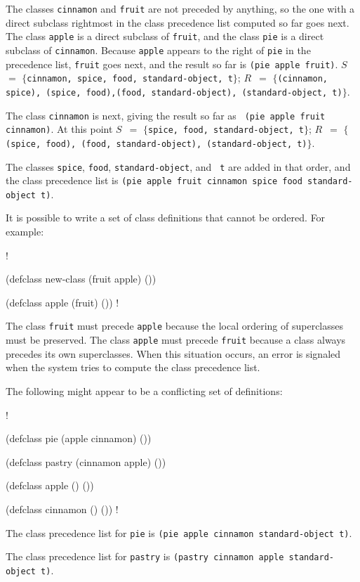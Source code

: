 The classes {\tt cinnamon} and {\tt fruit} are not preceded by
anything, so the one with a direct subclass rightmost in the class
precedence list computed so far goes next.  The class {\tt apple} is a
direct subclass of {\tt fruit}, and the class {\tt pie} is a direct
subclass of {\tt cinnamon}.  Because {\tt apple} appears to the right
of {\tt pie} in the precedence list, {\tt fruit} goes next, and the
result so far is {\tt (pie apple fruit)}.  $S$~$=$ $\{${\tt cinnamon,
spice, food, standard-object, t}$\}$; $R$~$=$ $\{${\tt (cinnamon,
spice), (spice, food),\hfil\break (food, standard-object),
(standard-object, t)}$\}$.

The class {\tt cinnamon} is next, giving the result so far as {\tt
(pie apple fruit cinnamon)}.  At this point $S$~$=$ $\{${\tt spice,
food, standard-object, t}$\}$; $R$~$=$ $\{${\tt (spice, food), (food,
standard-object), (standard-object, t)}$\}$.

The classes {\tt spice}, {\tt food}, {\tt standard-object}, and {\tt
t} are added in that order, and the class precedence list is {\tt (pie
apple fruit cinnamon spice food standard-object t)}.

It is possible to write a set of class definitions that cannot be 
ordered.   For example: 

\screen!

(defclass new-class (fruit apple) ())

(defclass apple (fruit) ())
\endscreen!

The class {\tt fruit} must precede {\tt apple} because the local
ordering of superclasses must be preserved.  The class {\tt apple} must
precede {\tt fruit} because a class always precedes its own
superclasses.  When this situation occurs, an error is signaled when
the system tries to compute the class precedence list.

The following might appear to be a conflicting set of definitions:

\screen!

(defclass pie (apple cinnamon) ())

(defclass pastry (cinnamon apple) ())

(defclass apple () ())

(defclass cinnamon () ())
\endscreen!

The class precedence list for {\tt pie} is {\tt (pie apple cinnamon
standard-object t)}.

The class precedence list for {\tt pastry} is  {\tt (pastry cinnamon apple 
standard-object t)}.

